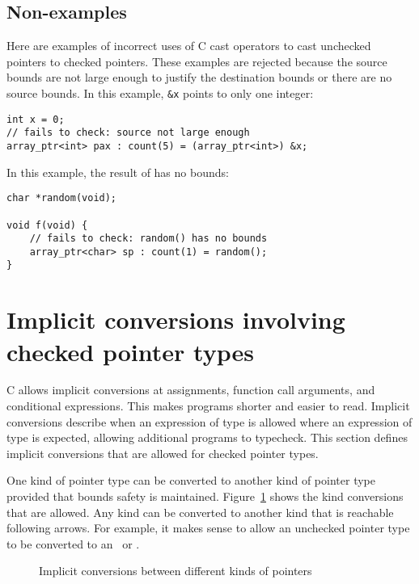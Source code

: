 \subsection{Non-examples}

Here are examples of incorrect uses of C cast operators to cast unchecked
pointers to checked pointers.  These examples are rejected because the
source bounds are not large enough to justify the destination bounds or
there are no source bounds.
In this example, \lstinline|&x| points to only one integer:
\begin{lstlisting}
int x = 0;
// fails to check: source not large enough
array_ptr<int> pax : count(5) = (array_ptr<int>) &x;
\end{lstlisting}
In this example, the result of  has no bounds:
\begin{lstlisting}
char *random(void);

void f(void) {
    // fails to check: random() has no bounds
    array_ptr<char> sp : count(1) = random();
}
\end{lstlisting}

\section{Implicit conversions involving checked pointer types}
\label{section:implicit-conversions}

C allows implicit conversions at assignments, function call arguments,
and conditional expressions. This makes programs shorter and easier to
read.  Implicit conversions describe when an expression of type
 is allowed where an expression of type  is expected,
allowing additional programs to typecheck.
This section defines implicit conversions that are allowed for checked
pointer types.

One kind of pointer type can be converted to another kind of pointer type provided
that bounds safety is maintained.  Figure~\ref{fig:implicit-type-conversion} shows the
kind conversions that are allowed.  Any kind can be converted to another
kind that is reachable following arrows. For example, it makes sense to allow an unchecked
pointer type to be converted to an \arrayptr\ or \ptr.

\begin{figure}
\begin{center}
\end{center}
\caption{Implicit conversions between different kinds of pointers}
\label{fig:implicit-type-conversion}
\end{figure}

